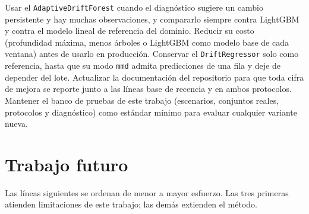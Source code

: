 \documentclass[11pt,a4paper]{article}
\begin{document}
Usar el \texttt{AdaptiveDriftForest} cuando el diagnóstico sugiere un cambio persistente y hay muchas
observaciones, y compararlo siempre contra LightGBM y contra el modelo lineal de referencia del dominio.
Reducir su costo (profundidad máxima, menos árboles o LightGBM como modelo base de cada ventana) antes de
usarlo en producción. Conservar el \texttt{DriftRegressor} solo como referencia, hasta que su modo \texttt{mmd} admita predicciones de una fila y deje de
depender del lote. Actualizar la documentación del repositorio para que toda cifra de mejora se
reporte junto a las líneas base de recencia y en ambos protocolos. Mantener el banco de pruebas de
este trabajo (escenarios, conjuntos reales, protocolos y diagnóstico) como estándar mínimo para
evaluar cualquier variante nueva.

\section{Trabajo futuro}\label{sec:futuro}

Las líneas siguientes se ordenan de menor a mayor esfuerzo. Las tres primeras atienden limitaciones
de este trabajo; las demás extienden el método.
\end{document}
